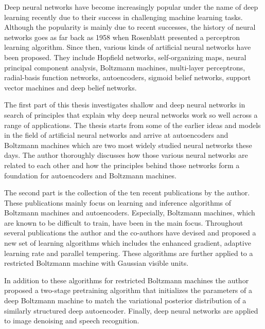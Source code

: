 Deep neural networks have become increasingly popular
under the name of deep learning recently due to their
success in challenging machine learning tasks.  Although the
popularity is mainly due to recent successes, the
history of neural networks goes as far back as 1958 when
Rosenblatt presented a perceptron learning algorithm.  Since
then, various kinds of artificial neural networks have been
proposed. They include Hopfield networks, self-organizing
maps, neural principal component analysis, Boltzmann
machines, multi-layer perceptrons, radial-basis function
networks, autoencoders, sigmoid belief networks, support
vector machines and deep belief networks.

The first part of this thesis investigates shallow and deep
neural networks in search of principles that explain why deep
neural networks work so well across a range of applications.
The thesis starts from
some of the earlier ideas and models in the field of
artificial neural networks and arrive at autoencoders and
Boltzmann machines which are two most widely studied neural
networks these days. The author thoroughly discusses how
those various neural networks are related to each other and
how the principles behind those networks form a foundation for
autoencoders and Boltzmann machines. 

The second part is the collection of the ten recent
publications by the author. These publications mainly focus
on learning and inference algorithms of Boltzmann machines
and autoencoders. Especially, Boltzmann machines, which are
known to be difficult to train, have been in the main focus.
Throughout several publications the author and the
co-authors have devised and proposed a new set of learning
algorithms which includes the enhanced gradient, adaptive
learning rate and parallel tempering. These algorithms are
further applied to a restricted Boltzmann machine with
Gaussian visible units.

In addition to these algorithms for restricted Boltzmann
machines the author proposed a two-stage pretraining
algorithm that initializes the parameters of a deep
Boltzmann machine to match the variational posterior
distribution of a similarly structured deep autoencoder.
Finally, deep neural networks are applied to image denoising
and speech recognition.







